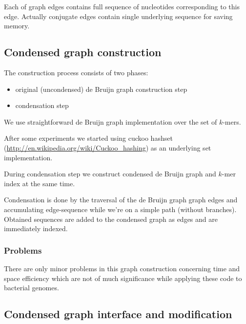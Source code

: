 \documentclass[12pt]{article}
\newcommand{\dbg}{de Bruijn graph}
\begin{document}
Each of graph edges contains full sequence of nucleotides corresponding to this edge. Actually conjugate edges contain single underlying sequence for saving memory.

\subsection{Condensed graph construction}
The construction process consists of two phases:
\begin{itemize}
\item original (uncondensed) \dbg{} construction step
\item condensation step
\end{itemize}

We use straightforward \dbg{} implementation over the set of $k$-mers. 

After some experiments we started using cuckoo hashset (\url{http://en.wikipedia.org/wiki/Cuckoo_hashing}) as an underlying set implementation.

During condensation step we construct condensed \dbg{} and $k$-mer index at the same time.

Condensation is done by the traversal of the \dbg{} graph edges and accumulating edge-sequence while we're on a simple path (without branches). Obtained sequences are added to the condensed graph as edges and are immediately indexed.


\subsubsection{Problems}
There are only minor problems in this graph construction concerning time and space efficiency which are not of much significance while applying these code to bacterial genomes. %


\subsection{Condensed graph interface and modification}
\end{document}
